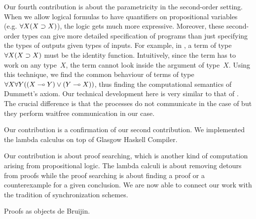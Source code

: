 Our fourth contribution is about the parametricity in the second-order
setting.  When we allow logical formulas to have quantifiers on
propositional variables (e.g. $\forall X(X\supset X)$), the logic gets much
more expressive.
Moreover, these second-order types can give more detailed specification
of programs than just specifying the types of outputs given types of
inputs.
For example, in , a term of type $\forall X(X\supset X)$
must be the identity function.
Intuitively, since the term has to work on any type~$X$, the term cannot
look inside the argument of type~$X$.
Using this technique, we find the common behaviour of terms of type
$\forall X \forall Y ((X\multimap Y)\lor (Y\multimap X))$, thus finding the
computational semantics of Dummett's axiom.
Our technical development here is very similar to that of
\citet{danos-krivine}.  The crucial difference is that the processes do
not communicate in the case of \citet{danos-krivine} but they perform
waitfree communication in our case.



Our  contribution is a confirmation of our second contribution.
We implemented the lambda calculus on top of
Glasgow Haskell Compiler.

Our  contribution is about proof searching, which is another
kind of computation arising from propositional logic.
The lambda calculi is about removing detours from proofs while the proof
searching is about finding a proof or a counterexample for a given
conclusion.  
We are now able to connect our work with the tradition of
synchronization schemes.

Proofs as objects de Bruijin.






